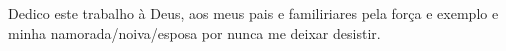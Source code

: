 Dedico este trabalho à Deus, aos meus pais e familiriares pela força e exemplo e
minha namorada/noiva/esposa por nunca me deixar desistir.
